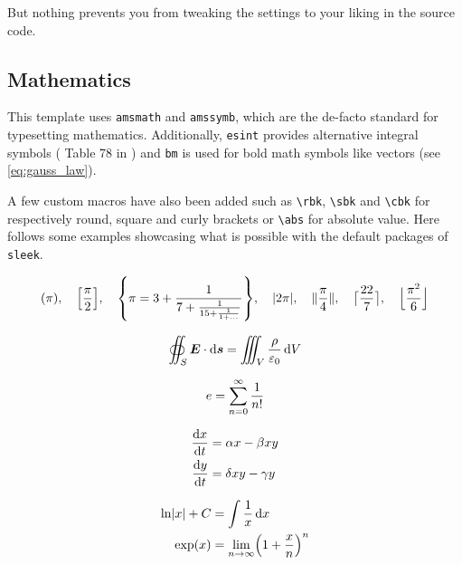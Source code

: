 \documentclass[a4paper, 12pt]{report}
\def\tbs{\textbackslash}
\begin{document}
    But nothing prevents you from tweaking the settings to your liking in the source code.

    \subsection{Mathematics}

    This template uses \texttt{amsmath} and \texttt{amssymb}, which are the de-facto standard for typesetting mathematics. Additionally, \texttt{esint} provides alternative integral symbols (\cf{} Table 78 in \cite{pakin2020comprehensive}) and \texttt{bm} is used for bold math symbols like vectors (see \eqref{eq:gauss_law}).

    A few custom macros have also been added such as \texttt{\tbs{}rbk}, \texttt{\tbs{}sbk} and \texttt{\tbs{}cbk} for respectively round, square and curly brackets or \texttt{\tbs{}abs} for absolute value. Here follows some examples showcasing what is possible with the default packages of \texttt{sleek}.

    \[
        \rbk*{\pi}, \quad \sbk*{\frac{\pi}{2}}, \quad \cbk*{\pi=3 + \frac{1}{7 + \frac{1}{15 + \frac{1}{1 + \dots}}}}, \quad \abs{2 \pi}, \quad \norm{\frac{\pi}{4}}, \quad \ceil[\big]{\frac{22}{7}}, \quad \floor[\Big]{\frac{\pi^2}{6}}
    \]

    \begin{equation}\label{eq:gauss_law}
        \oiint_S \bm{E} \cdot \operatorname{d}\!{\bm{s}} = \iiint_V \frac{\rho}{\varepsilon_0} \operatorname{d}\!{V}
    \end{equation}

    \begin{equation*}
        e = \sum_{n=0}^\infty \frac{1}{n!}
    \end{equation*}

    \begin{subequations}
        \begin{align}
            \frac{\operatorname{d}\!{x}}{\operatorname{d}\!{t}} & = \alpha x - \beta xy \\
            \frac{\operatorname{d}\!{y}}{\operatorname{d}\!{t}} & = \delta xy - \gamma y
        \end{align}
    \end{subequations}

    \begin{align*}
        \ln \abs{x} + C & = \int \frac{1}{x} \d{x} \\
        \exp(x) & = \lim_{n \to \infty} \rbk*{1 + \frac{x}{n}}^n
    \end{align*}
\end{document}
